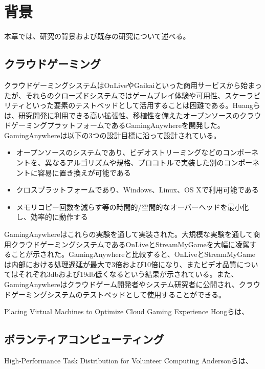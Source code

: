 \section{背景}
本章では、研究の背景および既存の研究について述べる。

\subsection{クラウドゲーミング}
クラウドゲーミングシステムはOnLiveやGaikaiといった商用サービスから始まったが、それらのクローズドシステムではゲームプレイ体験や可用性、スケーラビリティといった要素のテストベッドとして活用することは困難である。Huangら\cite{gaminganywhere}は、研究開発に利用できる高い拡張性、移植性を備えたオープンソースのクラウドゲーミングプラットフォームであるGamingAnywhereを開発した。GamingAnywhereは以下の3つの設計目標に沿って設計されている。
\begin{itemize}
    \item オープンソースのシステムであり、ビデオストリーミングなどのコンポーネントを、異なるアルゴリズムや規格、プロコトルで実装した別のコンポーネントに容易に置き換えが可能である
    \item クロスプラットフォームであり、Windows、Linux、OS Xで利用可能である
    \item メモリコピー回数を減らす等の時間的/空間的なオーバーヘッドを最小化し、効率的に動作する
\end{itemize}
GamingAnywhereはこれらの実験を通して実装された。大規模な実験を通して商用クラウドゲーミングシステムであるOnLiveとStreamMyGameを大幅に凌駕することが示された。GamingAnywhereと比較すると、OnLiveとStreamMyGameは内部における処理遅延が最大で3倍および10倍になり、またビデオ品質についてはそれぞれ3dbおよび19db低くなるという結果が示されている。また、GamingAnywhereはクラウドゲーム開発者やシステム研究者に公開され、クラウドゲーミングシステムのテストベッドとして使用することができる。



Placing Virtual Machines to Optimize
Cloud Gaming Experience
Hongら\cite{placing}は、


\subsection{ボランティアコンピューティング}
High-Performance Task Distribution for Volunteer Computing 
Andersonら\cite{boinc}は、


